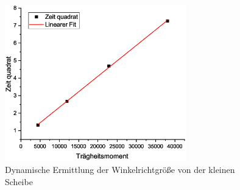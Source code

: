 \begin{figure}
\begin{center}
\includegraphics[width=0.7\textwidth]{Bilder/kal2.eps}
\caption{Dynamische Ermittlung der Winkelrichtgröße von der kleinen Scheibe}
\label{fig:kal2}
\end{center}
\end{figure}
